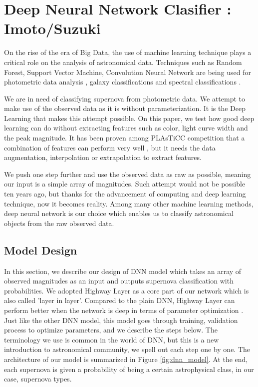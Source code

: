 \documentclass[useamsfonts]{pasj01}
\begin{document}
\section{Deep Neural Network Clasifier : Imoto/Suzuki}
On the rise of the era of Big Data, the use of machine learning technique plays a critical role on the analysis of astronomical data.  Techniques such as Random Forest, Support Vector Machine, Convolution Neural Network are being used for photometric data analysis \citep{pasquet19a}, galaxy classifications \citep{hausen19a} and spectral 
classifications \citep{garciadias18a,muthukrishna19c,sharma20a}.

We are in need of classifying supernova from photometric data.  We attempt to make use of the observed data as it is without parameterization.  It is the Deep Learning that makes this attempt possible.   On this paper, we test how good deep learning can do without extracting features such as color, light curve width and the peak magnitude.  It has been proven among PLAsTiCC competition that a combination of features can perform very well \citep{boone19a}, but it needs the data augmentation, interpolation or extrapolation to extract features.

We push one step further and use the observed data as raw as possible, meaning our input is a simple array of magnitudes.  Such attempt would not be possible ten years ago, but thanks for the advancement of computing and deep learning technique, now it becomes reality.  Among many other machine learning methods, deep neural network is our choice which enables us to classify astronomical objects from the raw observed data. 

\subsection{Model Design}
\label{sec:model} %
In this section, we describe our design of DNN model which takes an array of observed magnitudes as an input and outputs supernova classification with probabilities.  We adopted Highway Layer \citep{srivastava15a} as a core part of our network which is also called 'layer in layer'.  Compared to the plain DNN, Highway Layer can perform better when the network is deep in terms of parameter optimization \citep{srivastava15b}.   
Just like the other DNN model, this model goes through training, validation process to optimize parameters, and we describe the steps below.  The terminology we use is common in the world of DNN, but this is a new introduction to astronomical community, we spell out each step one by one.  The architecture of our model is summarized in Figure \ref{fig:dnn_model}.
At the end, each supernova is given a probability of being a certain astrophysical class, in our case, supernova types. 
\end{document}

